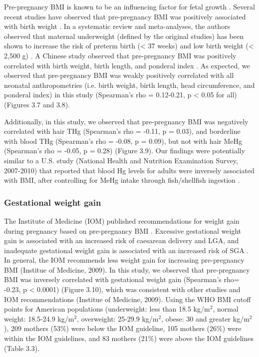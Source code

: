Pre-pregnancy BMI is known to be an influencing factor for fetal growth \citep{wardlaw2004low}. Several recent studies have observed that pre-pregnancy BMI was positively associated with birth weight \citep{frederick2008pre,nohr2008combined}. In a systematic review and meta-analyses, the authors observed that maternal underweight (defined by the original studies) has been shown to increase the risk of preterm birth (< 37 weeks) and low birth weight (< 2,500 g) \citep{han2012maternal}. A Chinese study observed that pre-pregnancy BMI was positively correlated with birth weight, birth length, and ponderal index \citep{yu2013elevated}. As expected, we observed that pre-pregnancy BMI was weakly positively correlated with all neonatal anthropometries (i.e. birth weight, birth length, head circumference, and ponderal index) in this study (Spearman's rho = 0.12-0.21, p < 0.05 for all) (Figures 3.7 and 3.8). 

Additionally, in this study, we observed that pre-pregnancy BMI was negatively correlated with hair THg (Spearman's rho = -0.11, p = 0.03), and borderline with blood THg (Spearman's rho = -0.08, p = 0.09), but not with hair MeHg (Spearman's rho = -0.05, p = 0.28) (Figure 3.9). Our findings were potentially similar to a U.S. study (National Health and Nutrition Examination Survey, 2007-2010) that reported that blood Hg levels for adults were inversely associated with BMI, after controlling for MeHg intake through fish/shellfish ingestion \citep{rothenberg2015influence}.

\subsubsection{Gestational weight gain}

The Institute of Medicine (IOM) published recommendations for weight gain during pregnancy based on pre-pregnancy BMI \citep{institute2009weight}. Excessive gestational weight gain is associated with an increased risk of caesarean delivery and LGA, and inadequate gestational weight gain is associated with an increased risk of SGA \citep{nohr2008combined}. In general, the IOM recommends less weight gain for
increasing pre-pregnancy BMI (Institue of Medicine, 2009). In this study, we observed that pre-pregnancy BMI was inversely correlated with gestational weight gain (Spearman's rho= -0.23, p < 0.0001) (Figure 3.10), which was consistent with other studies \citep{rode2007association,nohr2008combined,dietz2009low} and IOM recommendations (Institue of Medicine, 2009). Using the WHO BMI cutoff points for American populations (underweight: less than 18.5 kg/m$^{2}$, normal weight: 18.5-24.9 kg/m$^{2}$, overweight: 25-29.9 kg/m$^{2}$, obese: 30 and greater kg/m$^{2}$), 209 mothers (53\%) were below the IOM guideline, 105 mothers (26\%) were within the IOM guidelines, and 83 mothers (21\%) were above the IOM guidelines (Table 3.3).

